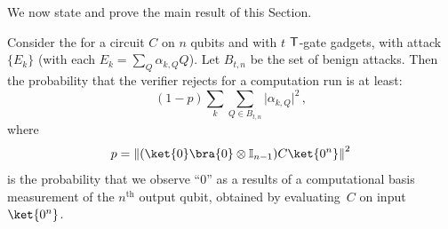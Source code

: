 \documentclass{toc}
\newcommand{\tgate}{{\sf T}}
\providecommand{\abs}[1]{\lvert#1\rvert}
\newcommand{\norm}[1]{\left\lVert#1\right\rVert}					%
\begin{document}
We now state and prove the main result of this Section.

\begin{lemma}\label{lem:acceptance-computation}
Consider the  for a circuit $C$ on $n$ qubits and with $t$ $\tgate$-gate gadgets, with attack $\{E_k\}$ (with each $E_k = \sum_{Q} \alpha_{k,Q} Q$).
   Let $B_{t,n}$ be the set of benign attacks. Then the probability  that the verifier rejects for a computation run is at least:
\begin{equation}
\label{eqn:acceptance-computation-benign}
(1-p) \sum_k \sum_{Q \in B_{t,n}} \abs{\alpha_{k,Q}}^2\,,
\end{equation}
where
\begin{equation}
  p= \norm{(\ket{0}\bra{0}\otimes \mathbb{I}_{n-1}) C \ket{0^n}}^2
\end{equation}
is the probability that we observe ``0'' as a results of a
computational basis measurement of the $n^{\text{th}}$ output qubit,
obtained by evaluating~$C$ on input~$\ket{0^n}$.
\end{lemma}
\end{document}
